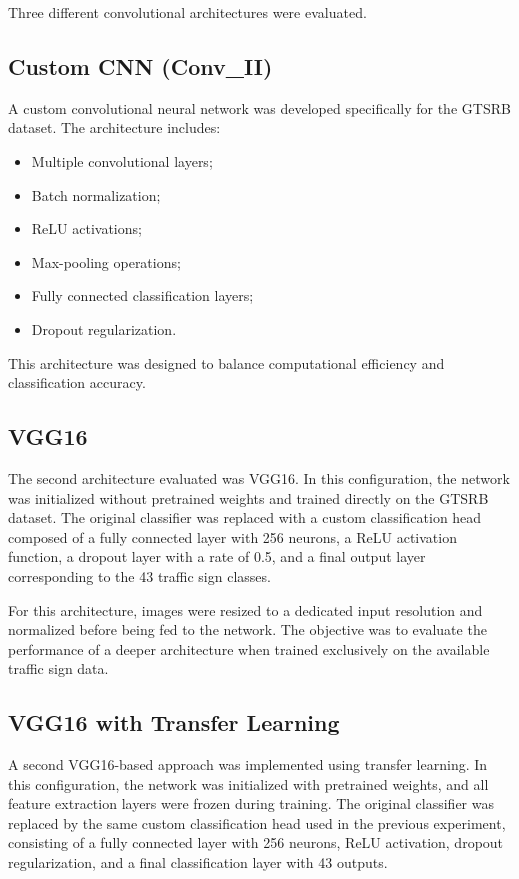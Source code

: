 \documentclass[conference,a4paper]{IEEEtran}
\begin{document}
Three different convolutional architectures were evaluated.

\subsection{Custom CNN (Conv\_II)}

A custom convolutional neural network was developed specifically for the GTSRB dataset. The architecture includes:

\begin{itemize}
\item Multiple convolutional layers;
\item Batch normalization;
\item ReLU activations;
\item Max-pooling operations;
\item Fully connected classification layers;
\item Dropout regularization.
\end{itemize}

This architecture was designed to balance computational efficiency and classification accuracy.

\subsection{VGG16}

The second architecture evaluated was VGG16. In this configuration, the network was initialized without pretrained weights and trained directly on the GTSRB dataset. The original classifier was replaced with a custom classification head composed of a fully connected layer with 256 neurons, a ReLU activation function, a dropout layer with a rate of 0.5, and a final output layer corresponding to the 43 traffic sign classes.

For this architecture, images were resized to a dedicated input resolution and normalized before being fed to the network. The objective was to evaluate the performance of a deeper architecture when trained exclusively on the available traffic sign data.

\subsection{VGG16 with Transfer Learning}

A second VGG16-based approach was implemented using transfer learning. In this configuration, the network was initialized with pretrained weights, and all feature extraction layers were frozen during training. The original classifier was replaced by the same custom classification head used in the previous experiment, consisting of a fully connected layer with 256 neurons, ReLU activation, dropout regularization, and a final classification layer with 43 outputs.
\end{document}
